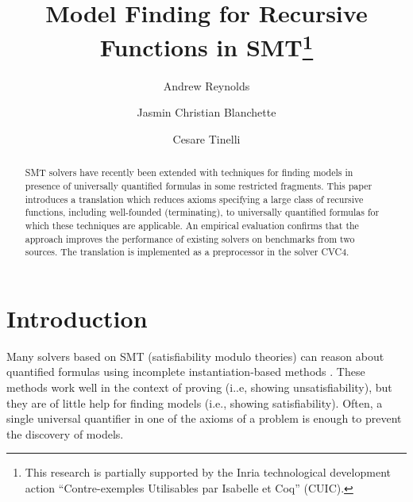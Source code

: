 \title{Model Finding for Recursive Functions in SMT\thanks{%
This research is partially supported by the Inria technological development
action ``Contre-exemples Utilisables par Isabelle et Coq'' (CUIC).
}
}

\author {Andrew Reynolds \and Jasmin Christian Blanchette \and Cesare Tinelli }

\maketitle

\begin{abstract}
\noindent
SMT solvers have recently been extended with techniques for finding models
in presence of universally quantified formulas in some restricted fragments.
This paper introduces a translation which reduces axioms specifying a large
class of recursive functions, including well-founded (terminating),
to universally quantified formulas for which these
techniques are applicable.
An empirical evaluation confirms that the approach improves 
the performance of existing solvers on benchmarks from two sources. 
The translation is implemented as a preprocessor in the solver CVC4.
\end{abstract}

\setcounter{footnote}{0}

\section{Introduction}
\label{sec:introduction}


Many solvers based on SMT (satisfiability modulo theories) can reason about
quantified formulas using incomplete instantiation-based methods
\cite{MouraBjoerner07,ReynoldsTinelliMoura14}.
These methods work well in the context of proving (i..e, showing
unsatisfiability), but they are of little help for finding models (i.e.,
showing satisfiability). Often, a single universal quantifier in one of the
axioms of a problem is enough to prevent the discovery of models.

